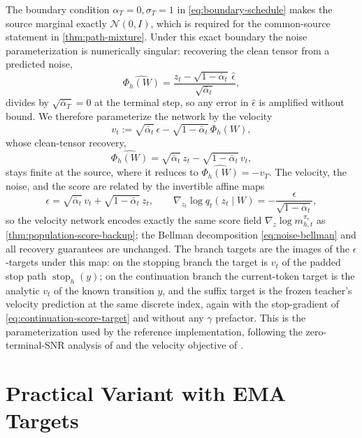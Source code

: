 \documentclass[11pt]{article}
\theoremstyle{definition}
\theoremstyle{remark}
\newcommand{\Normal}{\mathcal N}
\newcommand{\stoptraj}{\operatorname{stop}}
\newcommand{\targetpi}{\pi_e}
\begin{document}
The boundary condition $\alpha_T=0,\sigma_T=1$ in \cref{eq:boundary-schedule}
makes the source marginal exactly $\Normal(0,I)$, which is required for the
common-source statement in \cref{thm:path-mixture}. Under this exact boundary
the noise parameterization is numerically singular: recovering the clean tensor
from a predicted noise,
\begin{equation}
\widehat{\Phi_h(W)}
=
\frac{z_t-\sqrt{1-\bar\alpha_t}\,\hat\epsilon}{\sqrt{\bar\alpha_t}},
\end{equation}
divides by $\sqrt{\bar\alpha_T}=0$ at the terminal step, so any error in
$\hat\epsilon$ is amplified without bound. We therefore parameterize the network
by the velocity
\begin{equation}
v_t
:=
\sqrt{\bar\alpha_t}\,\epsilon
-
\sqrt{1-\bar\alpha_t}\,\Phi_h(W),
\end{equation}
whose clean-tensor recovery,
\begin{equation}
\widehat{\Phi_h(W)}
=
\sqrt{\bar\alpha_t}\,z_t
-
\sqrt{1-\bar\alpha_t}\,v_t,
\end{equation}
stays finite at the source, where it reduces to
$\widehat{\Phi_h(W)}=-v_T$. The velocity, the noise, and the score are related
by the invertible affine maps
\begin{equation}
\epsilon
=
\sqrt{\bar\alpha_t}\,v_t+\sqrt{1-\bar\alpha_t}\,z_t,
\qquad
\nabla_{z_t}\log q_t(z_t\mid W)
=
-\frac{\epsilon}{\sqrt{1-\bar\alpha_t}},
\end{equation}
so the velocity network encodes exactly the same score field
$\nabla_z\log m_{h,t}^{\targetpi}$ as
\cref{thm:population-score-backup}; the Bellman decomposition
\cref{eq:noise-bellman} and all recovery guarantees are unchanged. The branch
targets are the images of the $\epsilon$-targets under this map: on the stopping
branch the target is $v_t$ of the padded stop path
$\stoptraj_h(y)$; on the continuation branch the current-token target is the
analytic $v_t$ of the known transition $y$, and the suffix target is the frozen
teacher's velocity prediction at the same discrete index, again with the
stop-gradient of \cref{eq:continuation-score-target} and without any
$\gamma$ prefactor. This is the parameterization used by the reference
implementation, following the zero-terminal-SNR analysis of
\citet{lin2024commondiffusion} and the velocity objective of
\citet{salimans2022progressive}.

\section{Practical Variant with EMA Targets}
\label{app:ema}
\end{document}
